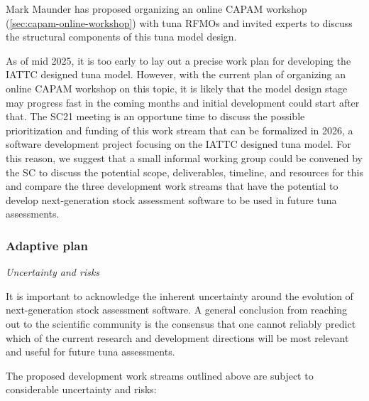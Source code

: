 \documentclass{SCreport}
\begin{document}
Mark Maunder has proposed organizing an online CAPAM workshop
(\autoref{sec:capam-online-workshop}) with tuna RFMOs and invited experts to
discuss the structural components of this tuna model design.

As of mid 2025, it is too early to lay out a precise work plan for developing
the IATTC designed tuna model. However, with the current plan of organizing an
online CAPAM workshop on this topic, it is likely that the model design stage
may progress fast in the coming months and initial development could start after
that. The SC21 meeting is an opportune time to discuss the possible
prioritization and funding of this work stream that can be formalized in 2026, a
software development project focusing on the IATTC designed tuna model. For this
reason, we suggest that a small informal working group could be convened by the
SC to discuss the potential scope, deliverables, timeline, and resources for
this and compare the three development work streams that have the potential to
develop next-generation stock assessment software to be used in future tuna
assessments.

\vspace{3ex}

\subsubsection{Adaptive plan}

\textit{Uncertainty and risks}

It is important to acknowledge the inherent uncertainty around the evolution of
next-generation stock assessment software. A general conclusion from reaching
out to the scientific community is the consensus that one cannot reliably
predict which of the current research and development directions will be most
relevant and useful for future tuna assessments.

The proposed development work streams outlined above are subject to considerable
uncertainty and risks:\\[-3ex]
\end{document}
